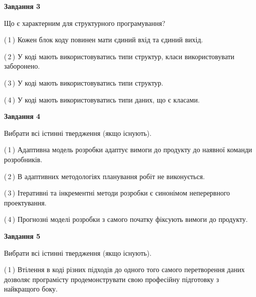 \documentclass[10pt, ukrainian]{article}
\begin{document}
{\begin {large}
{\begin {center}\textbf{Завдання 3}\end {center}}\par
Що є характерним для структурного програмування?\par
\vspace{2mm}



(\,1\,) Кожен блок коду повинен мати єдиний вхід та єдиний вихід.%



(\,2\,) У коді мають використовуватись типи структур, класи використовувати заборонено. %



(\,3\,) У коді мають використовуватись типи структур. %



(\,4\,) У коді мають використовуватись типи даних, що є класами. %


{\begin {center}\textbf{Завдання 4}\end {center}}\par
Вибрати всі істинні твердження (якщо існують).\par
\vspace{2mm}



(\,1\,) Адаптивна модель розробки адаптує вимоги до продукту до наявної команди розробників. %



(\,2\,) В адаптивних методологіях планування робіт не виконується. %



(\,3\,) Ітеративні та інкрементні методи розробки є синонімом неперервного проектування. %



(\,4\,) Прогнозні моделі розробки з самого початку фіксують вимоги до продукту. %


{\begin {center}\textbf{Завдання 5}\end {center}}\par
Вибрати всі істинні твердження (якщо існують).\par
\vspace{2mm}



(\,1\,) Втілення в коді різних підходів до одного того самого перетворення даних дозволяє програмісту продемонструвати свою професійну підготовку з найкращого боку. %




\end{large}}
\end{document}
